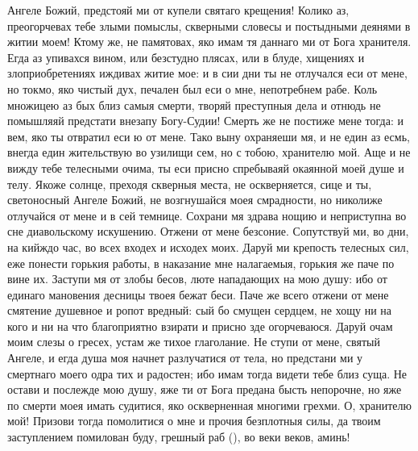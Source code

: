 \begin{mymulticols}
 

Ангеле Божий, предстояй ми от купели святаго крещения! Колико аз, преогорчевах тебе злыми помыслы, скверными словесы и постыдными деянями в житии моем! Ктому же, не памятовах, яко имам тя даннаго ми от Бога хранителя. Егда аз упивахся вином, или безстудно плясах, или в блуде, хищениях и злоприобретениях иждивах житие мое: и в сии дни ты не отлучался еси от мене, но токмо, яко чистый дух, печален был еси о мне, непотребнем рабе. Коль множицею аз бых близ самыя смерти, творяй преступныя дела и отнюдь не помышляяй предстати внезапу Богу-Судии! Смерть же не постиже мене тогда: и вем, яко ты отвратил еси ю от мене. Тако выну охраняеши мя, и не един аз есмь, внегда един жительствую во узилищи сем, но с тобою, хранителю мой. Аще и не вижду тебе телесными очима, ты еси присно спребываяй окаянной моей душе и телу. Якоже солнце, преходя скверныя места, не оскверняется, сице и ты, светоносный Ангеле Божий, не возгнушайся моея смрадности, но николиже отлучайся от мене и в сей темнице. Сохрани мя здрава нощию и неприступна во сне диавольскому искушению. Отжени от мене безсоние. Сопутствуй ми, во дни, на кийждо час, во всех входех и исходех моих. Даруй ми крепость телесных сил, еже понести горькия работы, в наказание мне налагаемыя, горькия же паче по вине их. Заступи мя от злобы бесов, люте нападающих на мою душу: ибо от единаго мановения десницы твоея бежат беси. Паче же всего отжени от мене смятение душевное и ропот вредный: сый бо смущен сердцем, не хощу ни на кого и ни на что благоприятно взирати и присно зде огорчеваюся. Даруй очам моим слезы о гресех, устам же тихое глаголание. Не ступи от мене, святый Ангеле, и егда душа моя начнет разлучатися от тела, но предстани ми у смертнаго моего одра тих и радостен; ибо имам тогда видети тебе близ суща. Не остави и послежде мою душу, яже ти от Бога предана бысть непорочне, но яже по смерти моея имать судитися, яко оскверненная многими грехми. О, хранителю мой! Призови тогда помолитися о мне и прочия безплотныя силы, да твоим заступлением помилован буду, грешный раб (), во веки веков, аминь! 

\end{mymulticols}

\mychapterending

